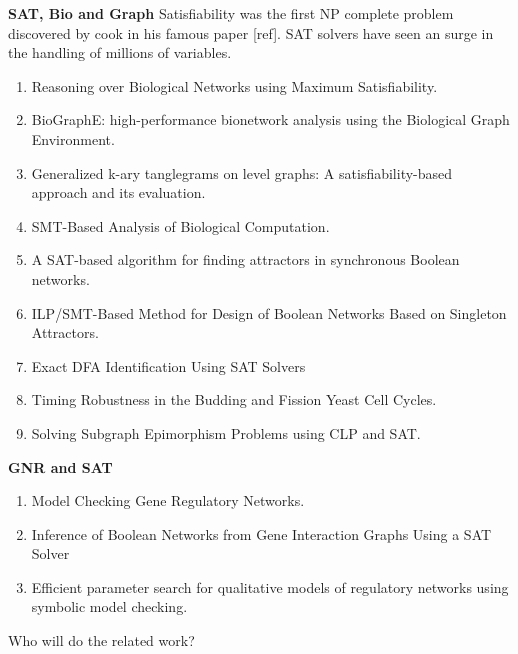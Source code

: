 

\textbf{SAT, Bio and Graph}
Satisfiability was the first NP complete problem discovered by cook in his famous paper [ref]. SAT solvers have seen an surge in the handling of millions of variables. 
\begin{enumerate}
\item Reasoning over Biological Networks using Maximum Satisfiability.
\item BioGraphE: high-performance bionetwork analysis using the Biological Graph Environment.
\item Generalized k-ary tanglegrams on level graphs: A satisfiability-based approach and its evaluation.
\item SMT-Based Analysis of Biological Computation.
\item A SAT-based algorithm for finding attractors in synchronous Boolean networks.
\item ILP/SMT-Based Method for Design of Boolean Networks Based on Singleton Attractors.
\item Exact DFA Identification Using SAT Solvers
\item Timing Robustness in the Budding and Fission Yeast Cell Cycles.
\item Solving Subgraph Epimorphism Problems using CLP
and SAT.
\end{enumerate}

\textbf{GNR and SAT}
\begin{enumerate}
\item Model Checking Gene Regulatory Networks.
\item Inference of Boolean Networks from Gene Interaction Graphs Using a SAT Solver
\item Efficient parameter search for qualitative models of regulatory networks using symbolic model checking.
\end{enumerate}

Who will do the related work?


